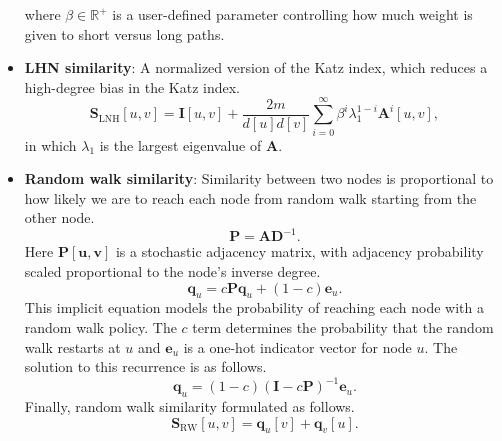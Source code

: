 \documentclass[twocolumn]{article}
\theoremstyle{plain}
\begin{document}
\begin{itemize}
        where $\beta \in \mathbb{R}^{+}$ is a user-defined parameter controlling how much weight is given to short versus long paths.
    \item \textbf{LHN similarity}: A normalized version of the Katz index, which reduces a high-degree bias in the Katz index.
        \begin{equation}
            \mathbf{S}_{\text{LNH}}[u,v] = \mathbf{I}[u,v] + \frac{2m}{d[u]d[v]} \sum_{i=0}^{\infty}\beta^i\lambda^{1-i}_1 \mathbf{A}^i[u,v],
        \end{equation}
        in which $\lambda_1$ is the largest eigenvalue of $\mathbf{A}$.
    \item \textbf{Random walk similarity}: Similarity between two nodes is proportional to how likely we are to reach each node from random walk starting from the other node.
        \begin{equation}
            \mathbf{P} = \mathbf{A}\mathbf{D}^{-1}.
        \end{equation}
        Here $\mathbf{P[u,v]}$ is a stochastic adjacency matrix, with adjacency probability scaled proportional to the node's inverse degree.
        \begin{equation}
            \mathbf{q}_u = c\mathbf{P}\mathbf{q}_u + (1-c)\mathbf{e}_u.
        \end{equation}
        This implicit equation models the probability of reaching each node with a random walk policy. The $c$ term determines the probability that the random walk restarts at $u$ and $\mathbf{e}_u$ is a one-hot indicator vector for node $u$. The solution to this recurrence is as follows.
        \begin{equation}
            \mathbf{q}_u = (1-c)(\mathbf{I}-c\mathbf{P})^{-1}\mathbf{e}_u.
        \end{equation}
        Finally, random walk similarity formulated as follows.
        \begin{equation}
            \mathbf{S}_{\text{RW}}[u,v] = \mathbf{q}_u[v] + \mathbf{q}_v[u].
        \end{equation}
\end{itemize}
\end{document}
